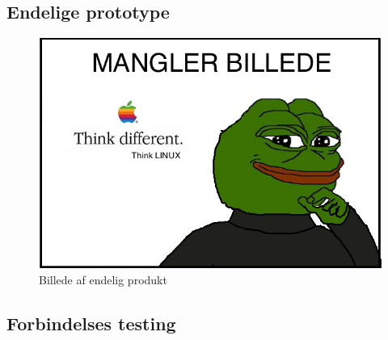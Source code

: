 \subsection{Endelige prototype}\label{subs:endeligProto}
\begin{figure}[H]
	\centering
    \includegraphics[width=13cm]{figures/stock.jpg}
	\caption{Billede af endelig produkt}
	\label{fig:endeligPrototype}
\end{figure}
\subsection{Forbindelses testing}


